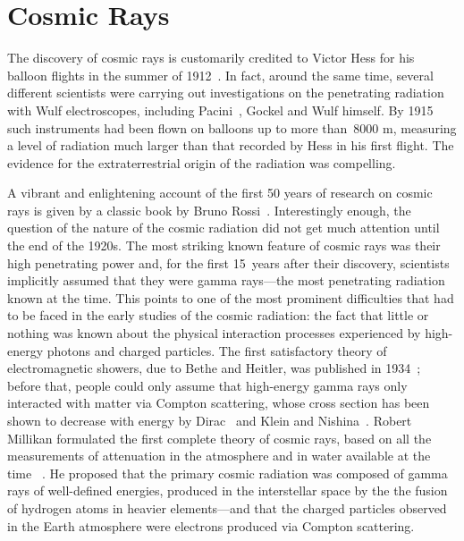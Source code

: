 %


\chapter{Cosmic Rays}

The discovery of cosmic rays is customarily credited to Victor Hess for his balloon
flights in the summer of 1912~\cite{Hess:1912srp}. In fact, around the same time,
several different scientists were carrying out investigations on the penetrating
radiation with Wulf electroscopes, including Pacini~\cite{1912NCim....3...93P},
Gockel and Wulf himself. By 1915 such instruments had been flown on balloons up
to more than~8000 m, measuring a level of radiation much larger than that recorded
by Hess in his first flight. The evidence for the extraterrestrial origin of the
radiation was compelling.

A vibrant and enlightening account of the first 50 years of research on cosmic rays
is given by a classic book by Bruno Rossi~\cite{rossi1964cosmic}. Interestingly enough,
the question of the nature of the cosmic radiation did not get much attention until
the end of the 1920s. The most striking known feature of cosmic rays was their high
penetrating power and, for the first 15~years after their discovery, scientists
implicitly assumed that they were gamma rays---the most penetrating radiation known at
the time. This points to one of the most prominent difficulties that had to be faced
in the early studies of the cosmic radiation: the fact that little or nothing was
known about the physical interaction processes experienced by high-energy photons
and charged particles. The first satisfactory theory of electromagnetic showers,
due to Bethe and Heitler, was published in 1934~\cite{41}; before that, people could
only assume that high-energy gamma rays only interacted with matter via Compton
scattering, whose cross section has been shown to decrease with energy by
Dirac~\cite{42} and Klein and Nishina~\cite{43}. Robert Millikan formulated the
first complete theory of cosmic rays, based on all the measurements of attenuation
in the atmosphere and in water available at the time~ \cite{44}. He proposed that
the primary cosmic radiation was composed of gamma rays of well-defined energies,
produced in the interstellar space by the the fusion of hydrogen atoms in heavier
elements---and that the charged particles observed in the Earth atmosphere were electrons
produced via Compton scattering.

